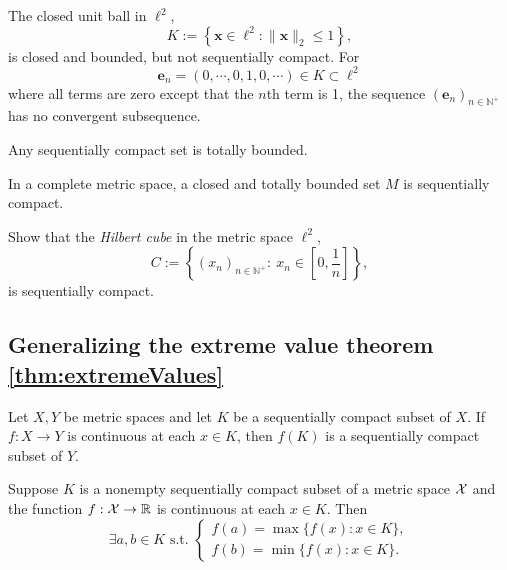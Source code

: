 \begin{exm}
  \label{exm:closedBallInEll2}
  The closed unit ball in $\ell^2$, 
  \begin{equation}
    \label{eq:closedBallInEll2}
    K:= \left\{\mathbf{x}\in \ell^2 :
      \|\mathbf{x}\|_2 \le 1 \right\}, 
  \end{equation}
  is closed and bounded, but not sequentially compact.
  For
  \begin{displaymath}
    \mathbf{e}_n = (0,\cdots,0,1,0,\cdots)\in K \subset \ell^2
  \end{displaymath}
  where all terms are zero except that the $n$th term is 1, 
  the sequence $(\mathbf{e}_n)_{n\in \mathbb{N}^+}$
  has no convergent subsequence.
\end{exm}

\begin{lem}
  \label{lem:compactnessImpliesTotalBoundedness}
  Any sequentially compact set is totally bounded. 
\end{lem}

\begin{lem}
  \label{lem:seqCompactFromTotalBoundedness}
  In a complete metric space,
  a closed and totally bounded set $M$ is sequentially compact.
\end{lem}

\begin{exc}
  \label{exm:HilbertCube}
  Show that the \emph{Hilbert cube}
  in the metric space $\ell^2$, %
  \begin{equation}
    \label{eq:HilbertCube}
    C := \left\{
      (x_n)_{n\in \mathbb{N}^+}:\ x_n\in \left[0,\frac{1}{n}\right]
      \right\}, 
  \end{equation}
  is sequentially compact.
\end{exc}

\subsection{Generalizing
  the extreme value theorem \ref{thm:extremeValues}}
\label{sec:gener-extr-value}

\begin{lem}
  \label{lem:contFuncPreservesCompactness}
  Let $X,Y$ be metric spaces and
  let $K$ be a sequentially compact subset of $X$.
  If $f:X \rightarrow Y$ is continuous at each $x\in K$,
  then $f(K)$ is a sequentially compact subset of $Y$.
\end{lem}

\begin{thm}[Weierstrass]
  \label{thm:ExtremeValueThmGeneral}
  Suppose $K$ is a nonempty sequentially compact subset
  of a metric space ${\cal X}$
  and the function $f: {\cal X}\rightarrow \mathbb{R}$ is
  continuous at each $x\in K$.
  Then
  \begin{displaymath}
    \exists a,b\in K \text{ s.t. }
    \left\{
      \begin{array}{l}
        f(a) = \max\{f(x): x\in K\},
        \\
        f(b) = \min\{f(x): x\in K\}.
      \end{array}
      \right.
  \end{displaymath}
\end{thm}

